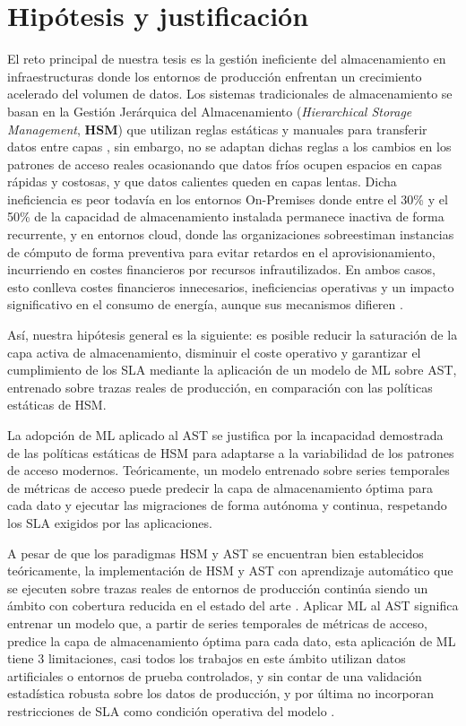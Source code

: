 \section{Hipótesis y justificación}
El reto principal de nuestra tesis es la gestión ineficiente del almacenamiento en infraestructuras donde los entornos de producción enfrentan un crecimiento acelerado del volumen de datos.
Los sistemas tradicionales de almacenamiento se basan en la Gestión Jerárquica del Almacenamiento (\textit{Hierarchical Storage Management}, \textbf{HSM}) que utilizan reglas estáticas y manuales para transferir datos entre capas \parencite{guerra2011tiering}, sin embargo, no se adaptan dichas reglas a los cambios en los patrones de acceso reales ocasionando que datos fríos ocupen espacios en capas rápidas y costosas, y que datos calientes queden en capas lentas.
Dicha ineficiencia es peor todavía en los entornos On-Premises donde entre el 30\% y el 50\% de la capacidad de almacenamiento instalada permanece inactiva de forma recurrente, y en entornos cloud, donde las organizaciones sobreestiman instancias de cómputo de forma preventiva para evitar retardos en el aprovisionamiento, incurriendo en costes financieros por recursos infrautilizados.
En ambos casos, esto conlleva costes financieros innecesarios, ineficiencias operativas y un impacto significativo en el consumo de energía, aunque sus mecanismos difieren \parencite{cortez2017resource}.

Así, nuestra hipótesis general es la siguiente: es posible reducir la saturación de la capa activa de almacenamiento, disminuir el coste operativo y garantizar el cumplimiento de los SLA mediante la aplicación de un modelo de ML sobre AST, entrenado sobre trazas reales de producción, en comparación con las políticas estáticas de HSM.

La adopción de ML aplicado al AST se justifica por la incapacidad demostrada de las políticas estáticas de HSM para adaptarse a la variabilidad de los patrones de acceso modernos.
Teóricamente, un modelo entrenado sobre series temporales de métricas de acceso puede predecir la capa de almacenamiento óptima para cada dato y ejecutar las migraciones de forma autónoma y continua, respetando los SLA exigidos por las aplicaciones.

A pesar de que los paradigmas HSM y AST se encuentran bien establecidos teóricamente, la implementación de HSM y AST con aprendizaje automático que se ejecuten sobre trazas reales de entornos de producción continúa siendo un ámbito con cobertura reducida en el estado del arte \parencite{zhang2022efficient, zhang2023data, zhang2024autonomous}.
Aplicar ML al AST significa entrenar un modelo que, a partir de series temporales de métricas de acceso, predice la capa de almacenamiento óptima para cada dato, esta aplicación de ML tiene 3 limitaciones,
casi todos los trabajos en este ámbito utilizan datos artificiales o entornos de prueba controlados, y sin contar de una validación estadística robusta sobre los datos de producción, y por última no incorporan restricciones de SLA como condición operativa del modelo \parencite{kumar2021ast, zhang2023data, zhang2024autonomous}.

